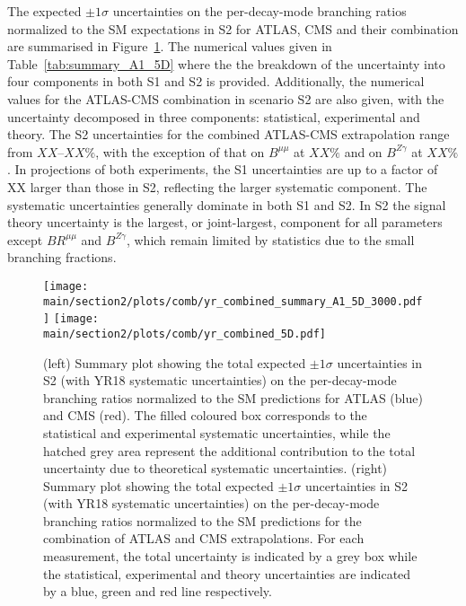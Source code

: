 The expected $\pm 1\sigma$ uncertainties on the per-decay-mode branching ratios normalized to the SM expectations in S2 for ATLAS, CMS and their combination are summarised in Figure~\ref{fig:summary_A1_5D}.  The numerical values given in Table~\ref{tab:summary_A1_5D} where the the breakdown of the uncertainty into four components in both S1 and S2 is provided. Additionally, the numerical values for the ATLAS-CMS combination in scenario S2 are also given, with the uncertainty decomposed in three components: statistical, experimental and theory.
The S2 uncertainties for the combined ATLAS-CMS extrapolation range from $XX$--$XX\%$, with the exception of that on $B^{\mu\mu}$ at $XX\%$ and on $B^{Z\gamma}$ at $XX\%$.
In projections of both experiments, the S1 uncertainties are up to a factor of XX larger than those in S2, reflecting the larger systematic component. 
 The systematic uncertainties generally dominate in both S1 and S2. In S2 the signal theory uncertainty is the largest, or joint-largest, component for all parameters except $BR^{\mu\mu}$ and $B^{Z\gamma}$, which remain limited by statistics due to the small  branching fractions. %


\begin{figure}[hbtp]
\centering
\texttt{[image: \\main/section2/plots/comb/yr\_combined\_summary\_A1\_5D\_3000.pdf]}%
\texttt{[image: \\main/section2/plots/comb/yr\_combined\_5D.pdf]}%
\caption{(left) Summary plot showing the total expected $\pm 1\sigma$ uncertainties in S2 (with YR18 systematic uncertainties) on the  per-decay-mode branching ratios normalized to the SM predictions   for ATLAS (blue)  and CMS (red). The filled coloured box corresponds to the statistical and experimental systematic uncertainties, while the hatched grey area represent the additional contribution to the total uncertainty due to theoretical systematic uncertainties.
(right) Summary plot showing the total expected $\pm 1\sigma$  uncertainties in S2 (with YR18 systematic uncertainties) on the per-decay-mode branching ratios normalized to the SM predictions for the combination of ATLAS and CMS extrapolations. For each measurement,  the total uncertainty is indicated by a grey box while the statistical, experimental and theory uncertainties are indicated by a blue, green and red line respectively.}
\label{fig:summary_A1_5D}
\end{figure}


